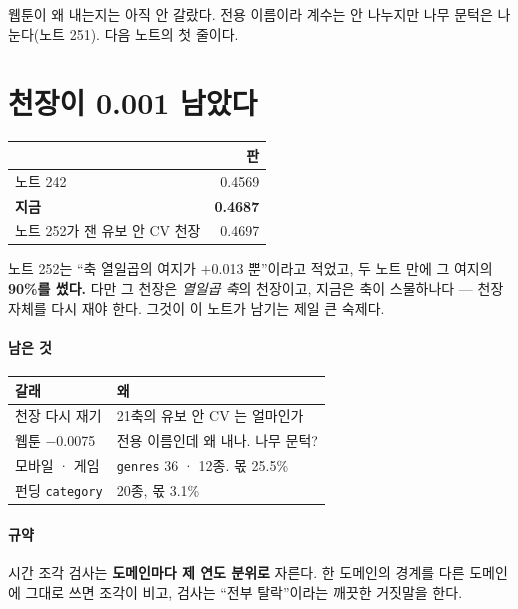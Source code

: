 \documentclass[10pt]{article}
\begin{document}
웹툰이 왜 내는지는 아직 안 갈랐다. 전용 이름이라 계수는 안 나누지만
나무 문턱은 나눈다(노트 251). 다음 노트의 첫 줄이다.

\section{천장이 0.001 남았다}

\begin{center}\small
\begin{tabular}{lr}
\hline
 & 판 \\
\hline
노트 242 & 0.4569 \\
\textbf{지금} & \textbf{0.4687} \\
노트 252가 잰 유보 안 CV 천장 & 0.4697 \\
\hline
\end{tabular}
\end{center}

노트 252는 ``축 열일곱의 여지가 $+$0.013 뿐''이라고 적었고, 두 노트 만에
그 여지의 \textbf{90\%를 썼다.} 다만 그 천장은 \emph{열일곱 축}의 천장이고,
지금은 축이 스물하나다 --- 천장 자체를 다시 재야 한다. 그것이 이 노트가
남기는 제일 큰 숙제다.

\paragraph{남은 것}
\begin{center}\small
\begin{tabular}{ll}
\hline
갈래 & 왜 \\
\hline
천장 다시 재기 & 21축의 유보 안 CV 는 얼마인가 \\
웹툰 $-$0.0075 & 전용 이름인데 왜 내나. 나무 문턱? \\
모바일 · 게임 & \texttt{genres} 36 · 12종. 몫 25.5\% \\
펀딩 \texttt{category} & 20종, 몫 3.1\% \\
\hline
\end{tabular}
\end{center}

\paragraph{규약} 시간 조각 검사는 \textbf{도메인마다 제 연도 분위로} 자른다.
한 도메인의 경계를 다른 도메인에 그대로 쓰면 조각이 비고, 검사는 ``전부
탈락''이라는 깨끗한 거짓말을 한다.
\end{document}
